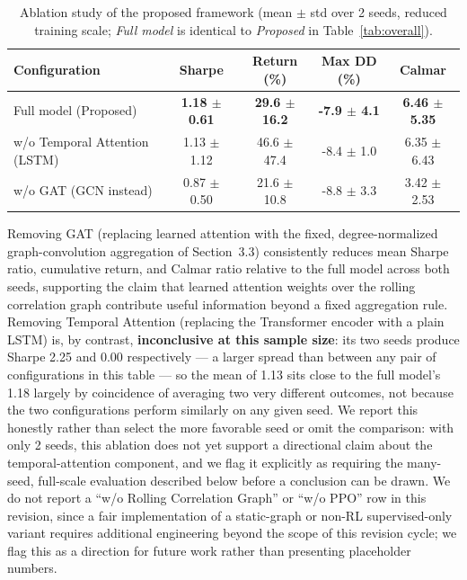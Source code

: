 \documentclass[runningheads]{llncs}
\begin{document}
\begin{table}[ht]
\centering
\caption{Ablation study of the proposed framework (mean $\pm$ std over 2 seeds, reduced training scale; \emph{Full model} is identical to \emph{Proposed} in Table~\ref{tab:overall}).}
\label{tab:ablation}
\small
\begin{tabular}{lcccc}
\toprule
\textbf{Configuration} &
\textbf{Sharpe} &
\textbf{Return (\%)} &
\textbf{Max DD (\%)} &
\textbf{Calmar} \\
\midrule
Full model (Proposed) & \textbf{1.18 $\pm$ 0.61} & \textbf{29.6 $\pm$ 16.2} & \textbf{-7.9 $\pm$ 4.1} & \textbf{6.46 $\pm$ 5.35} \\

w/o Temporal Attention (LSTM) & 1.13 $\pm$ 1.12 & 46.6 $\pm$ 47.4 & -8.4 $\pm$ 1.0 & 6.35 $\pm$ 6.43 \\

w/o GAT (GCN instead) & 0.87 $\pm$ 0.50 & 21.6 $\pm$ 10.8 & -8.8 $\pm$ 3.3 & 3.42 $\pm$ 2.53 \\

\bottomrule
\end{tabular}
\end{table}
Removing GAT (replacing learned attention with the fixed, degree-normalized graph-convolution aggregation of Section~3.3) consistently reduces mean Sharpe ratio, cumulative return, and Calmar ratio relative to the full model across both seeds, supporting the claim that learned attention weights over the rolling correlation graph contribute useful information beyond a fixed aggregation rule. Removing Temporal Attention (replacing the Transformer encoder with a plain LSTM) is, by contrast, \textbf{inconclusive at this sample size}: its two seeds produce Sharpe 2.25 and 0.00 respectively --- a larger spread than between any pair of configurations in this table --- so the mean of 1.13 sits close to the full model's 1.18 largely by coincidence of averaging two very different outcomes, not because the two configurations perform similarly on any given seed. We report this honestly rather than select the more favorable seed or omit the comparison: with only 2 seeds, this ablation does not yet support a directional claim about the temporal-attention component, and we flag it explicitly as requiring the many-seed, full-scale evaluation described below before a conclusion can be drawn. We do not report a ``w/o Rolling Correlation Graph'' or ``w/o PPO'' row in this revision, since a fair implementation of a static-graph or non-RL supervised-only variant requires additional engineering beyond the scope of this revision cycle; we flag this as a direction for future work rather than presenting placeholder numbers.
\end{document}
